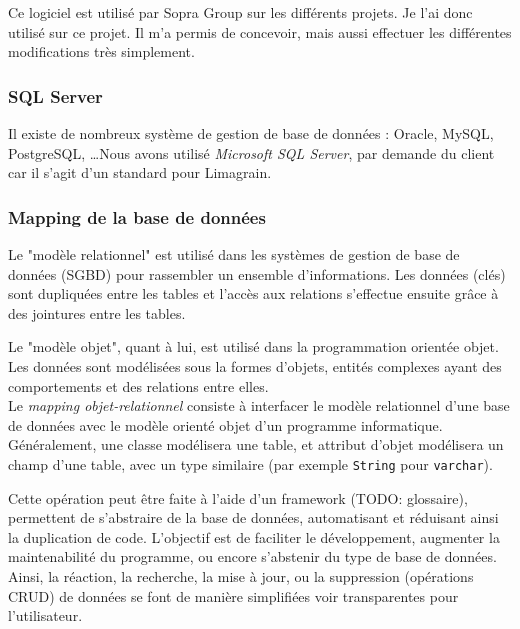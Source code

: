 Ce logiciel est utilisé par Sopra Group sur les différents projets. Je l'ai donc utilisé sur ce projet. Il m'a permis de concevoir, mais aussi effectuer les différentes modifications très simplement.


\subsubsection{SQL Server}

Il existe de nombreux système de gestion de base de données : Oracle, MySQL, PostgreSQL, \ldots Nous avons utilisé \textit{Microsoft SQL Server}, par demande du client car il s'agit d'un standard pour Limagrain.


\subsubsection{Mapping de la base de données}


Le "modèle relationnel" est utilisé dans les systèmes de gestion de base de données (SGBD) pour rassembler un ensemble d'informations. Les données (clés) sont dupliquées entre les tables et l'accès aux relations s'effectue ensuite grâce à des jointures entre les tables.

Le "modèle objet", quant à lui, est utilisé dans la programmation orientée objet. Les données sont modélisées sous la formes d'objets, entités complexes ayant des comportements et des relations entre elles.
\\

Le \textit{mapping objet-relationnel} consiste à interfacer le modèle relationnel d'une base de données avec le modèle orienté objet d'un programme informatique. Généralement, une classe modélisera une table, et attribut d'objet modélisera un champ d'une table, avec un type similaire (par exemple \lstinline{String} pour \lstinline{varchar}).



Cette opération peut être faite à l'aide d'un framework (TODO: glossaire), permettent de s'abstraire de la base de données, automatisant et réduisant ainsi la duplication de code. L'objectif est de faciliter le développement, augmenter la maintenabilité du programme, ou encore s'abstenir du type de base de données. Ainsi, la réaction, la recherche, la mise à jour, ou la suppression (opérations CRUD) de données se font de manière simplifiées voir transparentes pour l'utilisateur.

